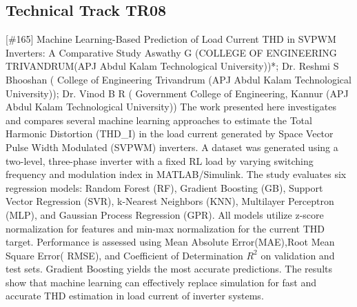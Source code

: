 \clearpage \subsection{Technical Track TR08}\nopagebreak {} \begin{abstract_online} {[\#165] Machine Learning-Based Prediction of Load Current THD in SVPWM Inverters: A Comparative Study} {} {Aswathy G (COLLEGE OF ENGINEERING TRIVANDRUM(APJ Abdul Kalam Technological University))*; Dr. Reshmi  S Bhooshan ( College of Engineering Trivandrum (APJ Abdul Kalam Technological University)); Dr. Vinod  B R ( Government College of Engineering, Kannur (APJ Abdul Kalam Technological University))} {} The work presented here investigates and compares several machine learning approaches to estimate the Total Harmonic Distortion (THD\_I)  in the load current generated by Space Vector Pulse Width Modulated (SVPWM) inverters. A dataset was generated using a two-level, three-phase inverter with a fixed RL load by varying switching frequency and modulation index in MATLAB/Simulink. The study evaluates six regression models: Random Forest (RF), Gradient Boosting (GB), Support Vector Regression (SVR), k-Nearest Neighbors (KNN), Multilayer Perceptron (MLP), and Gaussian Process Regression (GPR). All models utilize z-score normalization for features and min-max normalization for the current THD target. Performance is assessed using Mean Absolute Error(MAE),Root Mean Square Error( RMSE), and Coefficient of Determination $R^2$ on validation and test sets. Gradient Boosting yields the most accurate predictions. The results show that machine learning can effectively replace simulation for fast and accurate THD estimation in load current of inverter systems. \end{abstract_online} 
